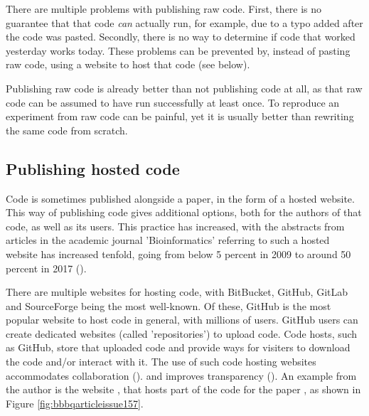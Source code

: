 
There are multiple problems with publishing raw code.
First, there is no guarantee that that code \emph{can} actually
run, for example, due to a typo added after the code was pasted.
Secondly, there is no way to determine if code that worked yesterday
works today. These problems can be prevented by, instead of
pasting raw code, using a website to host that code (see below).


Publishing raw code is already better than not publishing code at all,
as that raw code can be assumed to have run successfully at least once.
To reproduce an experiment from raw code can be painful, 
yet it is usually better than rewriting the same code from scratch.

\subsection{Publishing hosted code}

Code is sometimes published alongside a paper, 
in the form of a hosted website.
This way of publishing code gives additional options,
both for the authors of that code, as well as its users.
This practice has increased,
with the abstracts from articles in the academic journal
'Bioinformatics' referring to such a hosted website
has increased tenfold, going from below 5 percent in 2009 
to around 50 percent in 2017 (\cite{russell2018large}).


There are multiple websites for hosting code, with BitBucket, GitHub,
GitLab and SourceForge being the most well-known.
Of these, GitHub is the most popular website to host code in general,
with millions of users.
GitHub users can create dedicated websites (called 'repositories')
to upload code. Code hosts, such as GitHub, 
store that uploaded code and provide ways 
for visiters to download the code and/or interact with it.
The use of such code hosting websites
accommodates collaboration (\cite{perez2016ten}).
and improves transparency (\cite{gorgolewski2016practical}).
An example from the author is the website \cite{bbbqarticleissue157},
that hosts part of the code for the paper \cite{bilderbeek2022transmembrane},
as shown in Figure \ref{fig:bbbqarticleissue157}.

